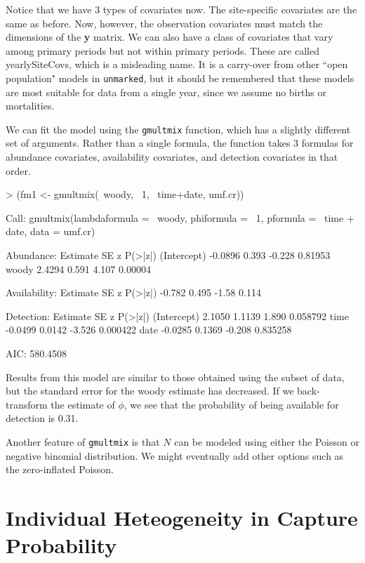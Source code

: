 \documentclass[a4paper]{article}
\renewenvironment{Schunk}{\vspace{\topsep}}{\vspace{\topsep}}
\begin{document}
Notice that we have 3 types of covariates now. The site-specific
covariates are the same as before. Now, however, the observation
covariates must match the dimensions of the {\bf y} matrix. We can
also have a class of covariates that vary among primary periods but
not within primary periods. These are called yearlySiteCovs, which is
a misleading name. It is a carry-over from other ``open population"
models in \texttt{unmarked}, but it should be remembered that these
models are most suitable for data from a single year, since we assume
no births or mortalities.

We can fit the model using the \texttt{gmultmix} function, which has a
slightly different set of arguments. Rather than a single formula, the
function takes 3 formulas for abundance covariates, availability
covariates, and detection covariates in that order.

\begin{Schunk}
\begin{Sinput}
> (fm1 <- gmultmix(~woody, ~1, ~time+date, umf.cr))
\end{Sinput}
\begin{Soutput}
Call:
gmultmix(lambdaformula = ~woody, phiformula = ~1, pformula = ~time + 
    date, data = umf.cr)

Abundance:
            Estimate    SE      z P(>|z|)
(Intercept)  -0.0896 0.393 -0.228 0.81953
woody         2.4294 0.591  4.107 0.00004

Availability:
 Estimate    SE     z P(>|z|)
   -0.782 0.495 -1.58   0.114

Detection:
            Estimate     SE      z  P(>|z|)
(Intercept)   2.1050 1.1139  1.890 0.058792
time         -0.0499 0.0142 -3.526 0.000422
date         -0.0285 0.1369 -0.208 0.835258

AIC: 580.4508 
\end{Soutput}
\end{Schunk}

Results from this model are similar to those obtained using the subset
of data, but the standard error for the woody estimate has
decreased. If we back-transform the estimate of $\phi$, we  see that
the probability of being available for detection is 0.31.

Another feature of \texttt{gmultmix} is that $N$ can be modeled using
either the Poisson or negative binomial distribution. We might
eventually add other options such as the zero-inflated Poisson.


\section{Individual Heteogeneity in Capture Probability}
\end{document}
